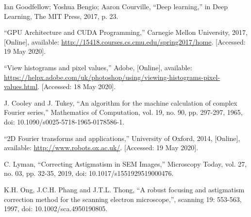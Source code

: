 \documentclass[12pt, twocolumn]{report}
\begin{document}
\begin{thebibliography}{00}
    Ian Goodfellow; Yoshua Bengio; Aaron Courville, ``Deep learning,'' in Deep Learning, The MIT Press, 2017, p. 23.

    ``GPU Architecture and CUDA Programming,'' Carnegie Mellon University, 2017, [Online], available: \url{http://15418.courses.cs.cmu.edu/spring2017/home}. [Accessed: 19 May 2020].

    ``View histograms and pixel values,'' Adobe, [Online], available: \url{https://helpx.adobe.com/uk/photoshop/using/viewing-histograms-pixel-values.html}. [Accessed: 18 May 2020].

    J. Cooley and J. Tukey, ``An algorithm for the machine calculation of complex Fourier series,'' Mathematics of Computation, vol. 19, no. 90, pp. 297-297, 1965, doi: 10.1090/s0025-5718-1965-0178586-1.

    ``2D Fourier transforms and applications,'' University of Oxford, 2014, [Online], available: \url{http://www.robots.ox.ac.uk/}. [Accessed: 19 May 2020].

    C. Lyman, ``Correcting Astigmatism in SEM Images,'' Microscopy Today, vol. 27, no. 03, pp. 32-35, 2019, doi: 10.1017/s1551929519000476.

    K.H. Ong, J.C.H. Phang and J.T.L. Thong, ``A robust focusing and astigmatism correction method for the scanning electron microscope,'', scanning 19: 553-563, 1997, doi: 10.1002/sca.4950190805.
\end{thebibliography}
\end{document}
